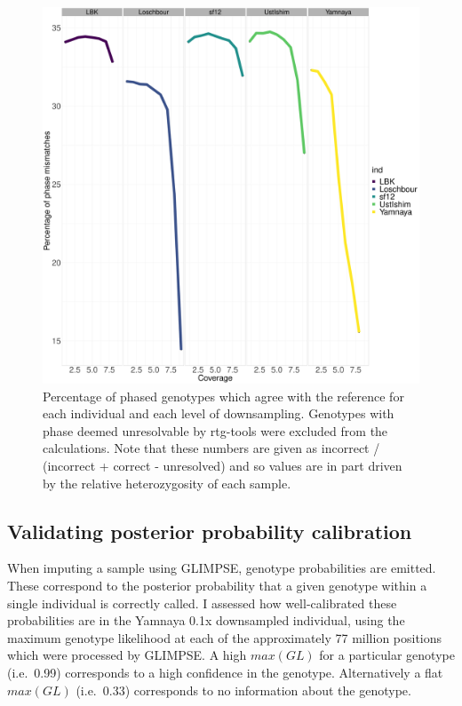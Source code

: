 \begin{figure}[htp]
    \centering
    \includegraphics[width=1.0\textwidth]{../images/chapter1/phasing_performance_downsampled.pdf}
    \caption{Percentage of phased genotypes which agree with the reference for each individual and each level of downsampling. Genotypes with phase deemed unresolvable by rtg-tools were excluded from the calculations. Note that these numbers are given as incorrect / (incorrect + correct - unresolved) and so values are in part driven by the relative heterozygosity of each sample.}
    \label{fig:phasing_performance_downsampled}
\end{figure}

\subsection{Validating posterior probability calibration}

When imputing a sample using GLIMPSE, genotype probabilities are emitted. These correspond to the posterior probability that a given genotype within a single individual is correctly called. I assessed how well-calibrated these probabilities are in the Yamnaya 0.1x downsampled individual, using the maximum genotype likelihood at each of the approximately 77 million positions which were processed by GLIMPSE. A high $max(GL)$ for a particular genotype (i.e.\ 0.99) corresponds to a high confidence in the genotype. Alternatively a flat $max(GL)$ (i.e.\ 0.33) corresponds to no information about the genotype. 

